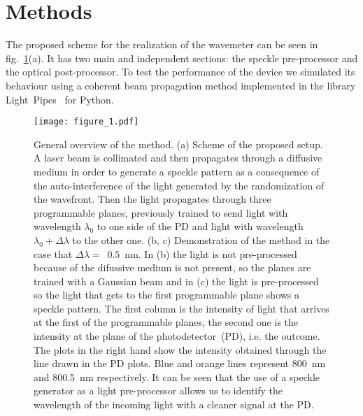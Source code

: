 \documentclass{optica-article}
\begin{document}
\section{Methods}\label{sec: pre}

The proposed scheme for the realization of the wavemeter can be seen in fig.~\ref{fig:Method}(a). It has two main and independent sections: the speckle pre-processor and the optical post-processor. To test the performance of the device we simulated its behaviour using a coherent beam propagation method implemented in the library Light~Pipes~\cite{lightpipes} for Python.

\begin{figure}[ht]
    \centering
    \texttt{[image: figure\_1.pdf]}
    \caption{General overview of the method. (a) Scheme of the proposed setup. A laser beam is collimated and then propagates through a diffusive medium in order to generate a speckle pattern as a consequence of the auto-interference of the light generated by the randomization of the wavefront. Then the light propagates through three programmable planes, previously trained to send light with wavelength $\lambda_0$ to one side of the PD and light with wavelength $\lambda_0 + \Delta \lambda$ to the other one. (b, c) Demonstration of the method in the case that $\Delta \lambda =$~$0.5$~nm. In (b) the light is not pre-processed because of the difussive medium is not present, so the planes are trained with a Gaussian beam and in (c) the light is pre-processed so the light that gets to the first programmable plane shows a speckle pattern. The first column is the intensity of light that arrives at the first of the programmable planes, the second one is the intensity at the plane of the photodetector~(PD), i.e. the outcome. The plots in the right hand show the intensity obtained through the line drawn in the PD plots. Blue and orange lines represent 800~nm and 800.5~nm respectively. It can be seen that the use of a speckle generator as a light pre-processor allows us to identify the wavelength of the incoming light with a cleaner signal at the PD.}
    \label{fig:Method}
\end{figure}
\end{document}
